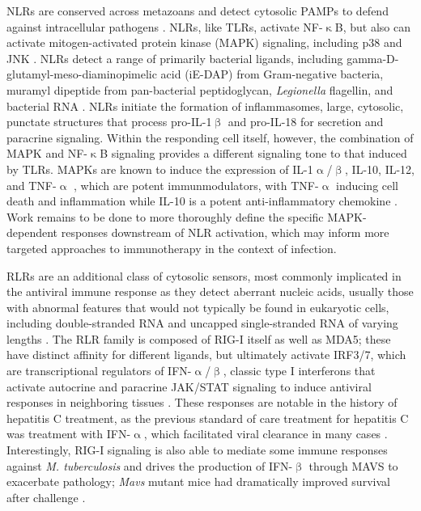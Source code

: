 NLRs are conserved across metazoans and detect cytosolic PAMPs to defend against intracellular pathogens \citep{Creagh2006, Clarke2014, Motta2015, Martinon2005}. NLRs, like TLRs, activate NF\hyp{}$\upkappa$B, but also can activate mitogen\hyp{}activated protein kinase (MAPK) signaling, including p38 and JNK \citep{Shaw2008, Franchi2009, Saxena2014, Platnich2019, Zhong2013, Velloso2019}. NLRs detect a range of primarily bacterial ligands, including gamma\hyp{}D\hyp{}glutamyl\hyp{}meso\hyp{}diaminopimelic acid (iE\hyp{}DAP) from Gram\hyp{}negative bacteria, muramyl dipeptide from pan\hyp{}bacterial peptidoglycan, \textit{Legionella} flagellin, and bacterial RNA \citep{Saxena2014, Franchi2009, Zhong2013}. NLRs initiate the formation of inflammasomes, large, cytosolic, punctate structures that process pro\hyp{}IL\hyp{}1$\upbeta$ and pro\hyp{}IL\hyp{}18 for secretion and paracrine signaling. Within the responding cell itself, however, the combination of MAPK and NF\hyp{}$\upkappa$B signaling provides a different signaling tone to that induced by TLRs. MAPKs are known to induce the expression of IL\hyp{}1$\upalpha$/$\upbeta$, IL\hyp{}10, IL\hyp{}12, and TNF\hyp{}$\upalpha$ \citep{Dong2002, Arthur2013, SoaresSilva2016}, which are potent immunmodulators, with TNF\hyp{}$\upalpha$ inducing cell death and inflammation while IL\hyp{}10 is a potent anti\hyp{}inflammatory chemokine \citep{SoaresSilva2016, Couper2008}. Work remains to be done to more thoroughly define the specific MAPK\hyp{}dependent responses downstream of NLR activation, which may inform more targeted approaches to immunotherapy in the context of infection.

RLRs are an additional class of cytosolic sensors, most commonly implicated in the antiviral immune response as they detect aberrant nucleic acids, usually those with abnormal features that would not typically be found in eukaryotic cells, including double\hyp{}stranded RNA and uncapped single\hyp{}stranded RNA of varying lengths \citep{Loo2011, Jia2021, Rehwinkel2020, Kawai2010}. The RLR family is composed of RIG\hyp{}I itself as well as MDA5; these have distinct affinity for different ligands, but ultimately activate IRF3/7, which are transcriptional regulators of IFN\hyp{}$\upalpha$/$\upbeta$, classic type I interferons that activate autocrine and paracrine JAK/STAT signaling to induce antiviral responses in neighboring tissues \citep{Loo2011}. These responses are notable in the history of hepatitis C treatment, as the previous standard of care treatment for hepatitis C was treatment with IFN\hyp{}$\upalpha$, which facilitated viral clearance in many cases \citep{Rong2010}. Interestingly, RIG-I signaling is also able to mediate some immune responses against \textit{M. tuberculosis} and drives the production of IFN-$\upbeta$ through MAVS to exacerbate pathology; \textit{Mavs} mutant mice had dramatically improved survival after challenge \citep{Cheng2018}.

